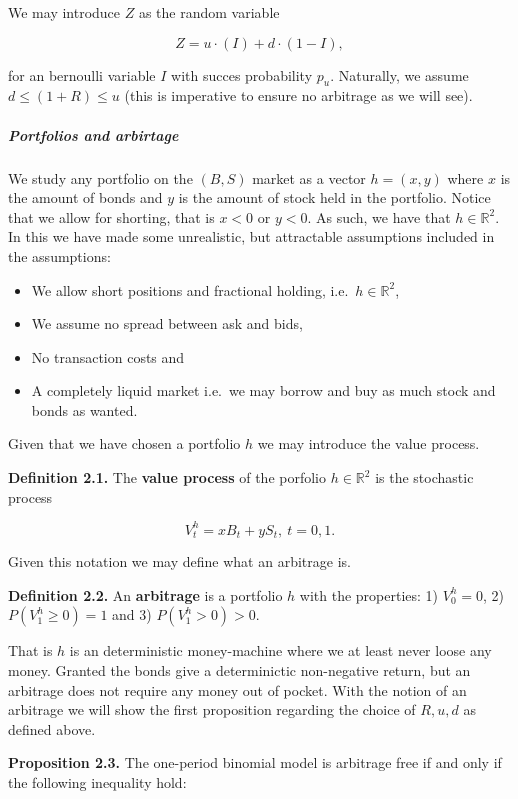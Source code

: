 \documentclass[
]{article}
\providecommand{\tightlist}{%
  \setlength{\itemsep}{0pt}\setlength{\parskip}{0pt}}
\begin{document}
We may introduce \(Z\) as the random variable

\[
Z=u\cdot (I)+d\cdot (1-I),
\]

for an bernoulli variable \(I\) with succes probability \(p_u\).
Naturally, we assume \(d\le (1+R)\le u\) (this is imperative to ensure
no arbitrage as we will see).

\hypertarget{portfolios-and-arbirtage}{%
\subparagraph{Portfolios and arbirtage}\label{portfolios-and-arbirtage}}

We study any portfolio on the \((B,S)\) market as a vector \(h=(x,y)\)
where \(x\) is the amount of bonds and \(y\) is the amount of stock held
in the portfolio. Notice that we allow for shorting, that is \(x<0\) or
\(y<0\). As such, we have that \(h\in \mathbb{R}^2\). In this we have
made some unrealistic, but attractable assumptions included in the
assumptions:

\begin{itemize}
\tightlist
\item
  We allow short positions and fractional holding,
  i.e.~\(h\in \mathbb{R}^2\),
\item
  We assume no spread between ask and bids,
\item
  No transaction costs and
\item
  A completely liquid market i.e.~we may borrow and buy as much stock
  and bonds as wanted.
\end{itemize}

Given that we have chosen a portfolio \(h\) we may introduce the value
process.

\textbf{Definition 2.1.} The \textbf{value process} of the porfolio
\(h\in\mathbb{R}^2\) is the stochastic process

\[V^h_t=xB_t+yS_t,\ t=0,1.\]

Given this notation we may define what an arbitrage is.

\textbf{Definition 2.2.} An \textbf{arbitrage} is a portfolio \(h\) with
the properties: 1) \(V^h_0=0\), 2) \(P(V^h_1\ge 0)=1\) and 3)
\(P(V^h_1>0)>0\).

That is \(h\) is an deterministic money-machine where we at least never
loose any money. Granted the bonds give a determinictic non-negative
return, but an arbitrage does not require any money out of pocket. With
the notion of an arbitrage we will show the first proposition regarding
the choice of \(R,u,d\) as defined above.

\textbf{Proposition 2.3.} The one-period binomial model is arbitrage
free if and only if the following inequality hold:
\end{document}

